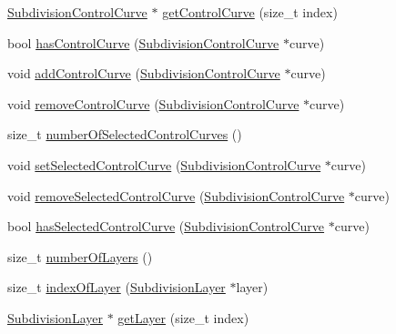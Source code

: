 \begin{DoxyCompactItemize}
\item 
\hyperlink{classShipCAD_1_1SubdivisionControlCurve}{Subdivision\-Control\-Curve} $\ast$ \hyperlink{classShipCAD_1_1SubdivisionSurface_a732c53d18277a4093ff7df12c0b08634}{get\-Control\-Curve} (size\-\_\-t index)
\item 
bool \hyperlink{classShipCAD_1_1SubdivisionSurface_acc30feeff1a889b9b291dcab3987b30a}{has\-Control\-Curve} (\hyperlink{classShipCAD_1_1SubdivisionControlCurve}{Subdivision\-Control\-Curve} $\ast$curve)
\item 
void \hyperlink{classShipCAD_1_1SubdivisionSurface_aa01ccc2ce7417960ca13075e38eb98e6}{add\-Control\-Curve} (\hyperlink{classShipCAD_1_1SubdivisionControlCurve}{Subdivision\-Control\-Curve} $\ast$curve)
\item 
void \hyperlink{classShipCAD_1_1SubdivisionSurface_abd51f7744580144550fabc086ea991b4}{remove\-Control\-Curve} (\hyperlink{classShipCAD_1_1SubdivisionControlCurve}{Subdivision\-Control\-Curve} $\ast$curve)
\item 
size\-\_\-t \hyperlink{classShipCAD_1_1SubdivisionSurface_a174e6e97b72c037693369e3716522ced}{number\-Of\-Selected\-Control\-Curves} ()
\item 
void \hyperlink{classShipCAD_1_1SubdivisionSurface_a5614a6ea5e1b67ec516328d64574cd9e}{set\-Selected\-Control\-Curve} (\hyperlink{classShipCAD_1_1SubdivisionControlCurve}{Subdivision\-Control\-Curve} $\ast$curve)
\item 
void \hyperlink{classShipCAD_1_1SubdivisionSurface_a1666628c8232ba11d386641fa7980ed7}{remove\-Selected\-Control\-Curve} (\hyperlink{classShipCAD_1_1SubdivisionControlCurve}{Subdivision\-Control\-Curve} $\ast$curve)
\item 
bool \hyperlink{classShipCAD_1_1SubdivisionSurface_acdfbfb4870bf517cd075fdf51a0de997}{has\-Selected\-Control\-Curve} (\hyperlink{classShipCAD_1_1SubdivisionControlCurve}{Subdivision\-Control\-Curve} $\ast$curve)
\item 
size\-\_\-t \hyperlink{classShipCAD_1_1SubdivisionSurface_ad9d00dfc848975306c43305e13e57ebe}{number\-Of\-Layers} ()
\item 
size\-\_\-t \hyperlink{classShipCAD_1_1SubdivisionSurface_accb1e8604e44f491f84e9fb77d1ab5c7}{index\-Of\-Layer} (\hyperlink{classShipCAD_1_1SubdivisionLayer}{Subdivision\-Layer} $\ast$layer)
\item 
\hyperlink{classShipCAD_1_1SubdivisionLayer}{Subdivision\-Layer} $\ast$ \hyperlink{classShipCAD_1_1SubdivisionSurface_a24b230e51a0c5fb3e7f51d0e2340eb9f}{get\-Layer} (size\-\_\-t index)

\end{DoxyCompactItemize}
